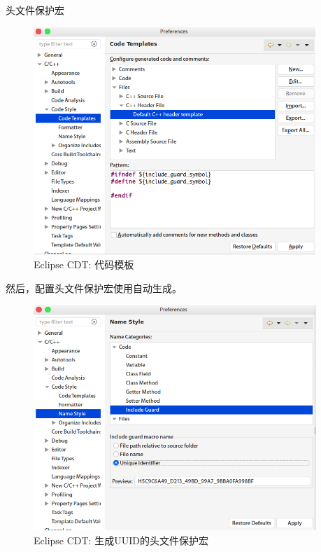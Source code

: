 \begin{content}
\begin{episode}{头文件保护宏}
\begin{content}
\begin{figure}[H]
\centering
\includegraphics[width=0.95\textwidth]{figures/xunit/eclipse-code-template.png}
\caption{Eclipse CDT: 代码模板}
 \label{fig:eclipse-code-template}
\end{figure}

然后，配置头文件保护宏使用自动生成。

\begin{figure}[H]
\centering
\includegraphics[width=0.95\textwidth]{figures/xunit/eclipse-include-guard.png}
\caption{Eclipse CDT: 生成UUID的头文件保护宏}
 \label{fig:eclipse-include-guard}
\end{figure}


\end{content}
\end{episode}
\end{content}
